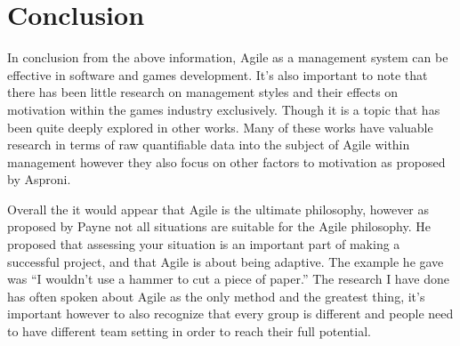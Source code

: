 \documentclass{scrartcl}
\begin{document}
\section{Conclusion}

In conclusion from the above information, Agile as a management system can be effective in software and games development. It's also important to note that there has been little research on management styles and their effects on motivation within the games industry exclusively. Though it is a topic that has been quite deeply explored in other works. \cite {EnhancePerformance, SoftwareProcess, LargeAgile, MicrosoftExp, UsingAgile, AgileDevelopment, MotivationTeamwork} Many of these works have valuable research in terms of raw quantifiable data into the subject of Agile within management however they also focus on other factors to motivation as proposed by Asproni.

Overall the it would appear that Agile is the ultimate philosophy, however as proposed by Payne not all situations are suitable for the Agile philosophy. He proposed that assessing your situation is an important part of making a successful project, and that Agile is about being adaptive. The example he gave was ``I wouldn't use a hammer to cut a piece of paper.''  The research I have done has often spoken about Agile as the only method and the greatest thing, it's important however to also recognize that every group is different and people need to have different team setting in order to reach their full potential.



\end{document}
